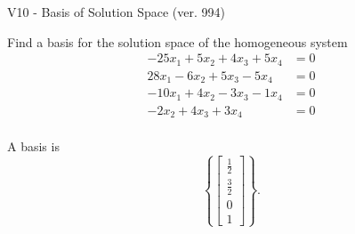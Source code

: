 \begin{exercise}
  \begin{exerciseTitle}V10 - Basis of Solution Space (ver. 994)\end{exerciseTitle}
  \begin{exerciseStatement}
    Find a basis for the solution space of the homogeneous system 
\begin{align*}
 -25 x_ 1 + 5 x_ 2 + 4 x_ 3 + 5 x_ 4 &= 0  \\ 
  28 x_ 1 -6 x_ 2 + 5 x_ 3 -5 x_ 4 &= 0  \\ 
  -10 x_ 1 + 4 x_ 2 -3 x_ 3 -1 x_ 4 &= 0  \\ 
  -2 x_ 2 + 4 x_ 3 + 3 x_ 4 &= 0  \\ 
 \end{align*}


 
  \end{exerciseStatement}

  \begin{exerciseAnswer}
   A basis is   
\[\left\{\left[\begin{array}{c}
\frac{1}{2} \\
\frac{3}{2} \\
0 \\
1
\end{array}\right]\right\}.\]

  


  \end{exerciseAnswer}
\end{exercise}